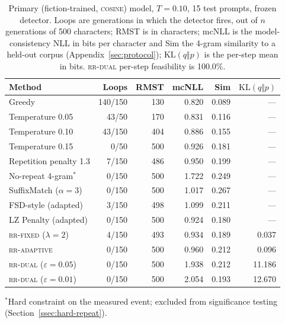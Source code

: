 \documentclass[11pt]{article}
\newcommand{\KL}{\mathrm{KL}}
\begin{document}
\begin{table}[ht]
\centering
\caption{Primary (fiction-trained, \textsc{cosine}) model, $T{=}0.10$, 15 test prompts, frozen detector. Loops are generations in which the detector fires, out of $n$ generations of 500 characters; RMST is in characters; mcNLL is the model-consistency NLL in bits per character and Sim the 4-gram similarity to a held-out corpus (Appendix~\ref{sec:protocol}); $\KL(q\Vert p)$ is the per-step mean in bits. \textsc{rr-dual} per-step feasibility is 100.0\%.}
\label{tab:main}
\begin{tabular}{@{}lrrrrr@{}}
\toprule
Method & Loops & RMST & mcNLL & Sim & $\KL(q\Vert p)$ \\
\midrule
Greedy & 140/150 & 130   & 0.820 & 0.089 & --- \\
Temperature 0.05 & 43/50 & 170   & 0.831 & 0.116 & --- \\
Temperature 0.10 & 43/150 & 404   & 0.886 & 0.155 & --- \\
Temperature 0.15 & 0/50 & 500   & 0.926 & 0.181 & --- \\
Repetition penalty 1.3 & 7/150 & 486   & 0.950 & 0.199 & --- \\
No-repeat 4-gram$^{*}$ & 0/150 & 500   & 1.722 & 0.249 & --- \\
SuffixMatch ($\alpha{=}3$) & 0/150 & 500   & 1.017 & 0.267 & --- \\
FSD-style (adapted) & 3/150 & 498   & 1.099 & 0.211 & --- \\
LZ Penalty (adapted) & 0/150 & 500   & 0.924 & 0.180 & --- \\
\textsc{rr-fixed} ($\lambda{=}2$) & 4/150 & 493   & 0.934 & 0.189 & 0.037 \\
\textsc{rr-adaptive} & 0/150 & 500   & 0.960 & 0.212 & 0.096 \\
\textsc{rr-dual} ($\varepsilon{=}0.05$) & 0/150 & 500 & 1.938 & 0.212 & 11.186 \\
\textsc{rr-dual} ($\varepsilon{=}0.01$) & 0/150 & 500 & 2.054 & 0.193 & 12.670 \\
\bottomrule
\end{tabular}

\vspace{4pt}
{\footnotesize $^{*}$Hard constraint on the measured event; excluded from significance testing (Section~\ref{ssec:hard-repeat}).}
\end{table}
\end{document}
